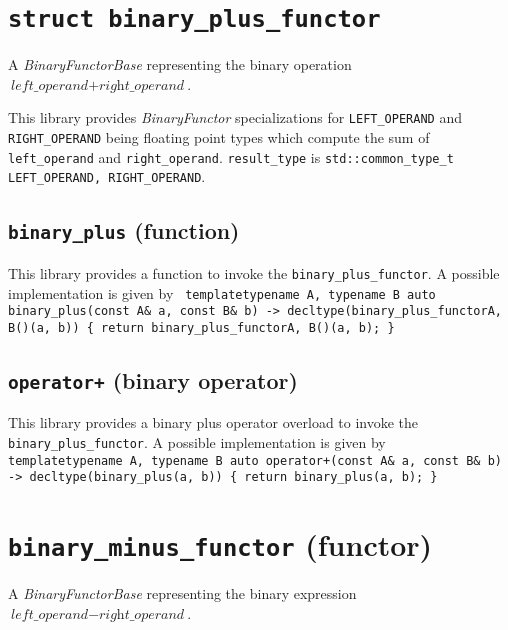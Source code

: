 \documentclass[oneside]{book}
\begin{document}


\section{\texttt{struct binary\_plus\_functor}}
A \textit{BinaryFunctorBase} representing the binary operation $\textit{left\_operand} + \textit{right\_operand}$.\newline

\noindent{}This library provides \textit{BinaryFunctor}       specializations for
\texttt{LEFT\_OPERAND} and \texttt{RIGHT\_OPERAND} being     floating point types
which compute  the sum    of  \texttt{left\_operand} and \texttt{right\_operand}.
\texttt{result\_type} is \texttt{std::common\_type\_t  \textlangle LEFT\_OPERAND,
RIGHT\_OPERAND\textrangle}.

\subsection{\texttt{binary\_plus} (function)}
This library provides a function to invoke the \texttt{binary\_plus\_functor}.
A possible implementation is given by\newline
\texttt{
template\textlangle typename A, typename B\textrangle\newline
auto binary\_plus(const A\& a, const B\& b) -> decltype(binary\_plus\_functor\textlangle A, B\textrangle()(a, b))\newline
\{ return binary\_plus\_functor\textlangle A, B\textrangle()(a, b); \}
}

\subsection{\texttt{operator+} (binary operator)}
This library provides a binary plus operator overload to invoke the \texttt{binary\_plus\_functor}.
A possible implementation is given by\newline
\texttt{
template\textlangle typename A, typename B\textrangle\newline
auto operator+(const A\& a, const B\& b) -> decltype(binary\_plus(a, b))\newline
\{ return binary\_plus(a, b); \}
}

\section{\texttt{binary\_minus\_functor} (functor)}
A \textit{BinaryFunctorBase} representing the binary expression $\textit{left\_operand} - \textit{right\_operand}$.\newline
\end{document}
